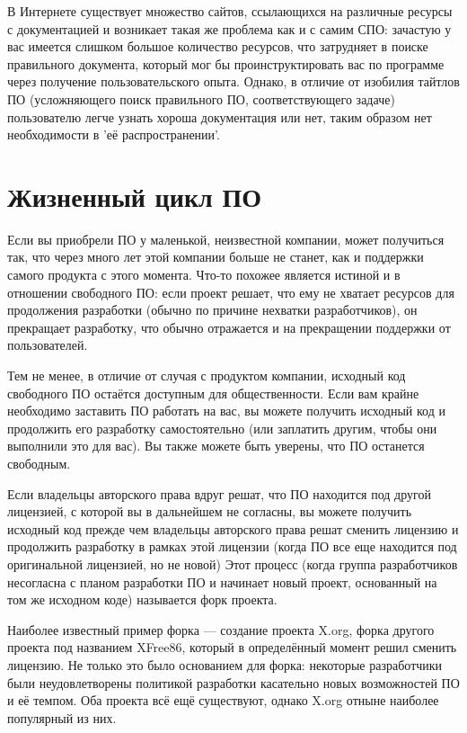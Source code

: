 \documentclass[12pt]{book}
\begin{document}
В Интернете существует множество сайтов, ссылающихся на различные ресурсы с документацией и возникает такая же проблема как и с самим СПО: зачастую у вас имеется слишком большое количество ресурсов, что затрудняет в поиске правильного документа, который мог бы проинструктировать вас по программе через получение пользовательского опыта. Однако, в отличие от изобилия тайтлов ПО (усложняющего поиск правильного ПО, соответствующего задаче) пользователю легче узнать хороша документация или нет, таким образом нет необходимости в 'её распространении'.

\section{Жизненный цикл ПО}

Если вы приобрели ПО у маленькой, неизвестной компании, может получиться так, что через много лет этой компании больше не станет, как и поддержки самого продукта с этого момента. Что-то похожее является истиной и в отношении   свободного ПО: если проект решает, что ему не хватает ресурсов для продолжения разработки (обычно по причине нехватки разработчиков), он прекращает разработку, что обычно отражается и на прекращении поддержки от пользователей.

Тем не менее, в отличие от случая с продуктом компании, исходный код свободного ПО остаётся доступным для общественности. Если вам крайне необходимо заставить ПО работать на вас, вы можете получить исходный код и продолжить его разработку самостоятельно (или заплатить другим, чтобы они выполнили это для вас). Вы также можете быть уверены, что ПО останется свободным. 

Если владельцы авторского права вдруг решат, что ПО находится под другой лицензией, с которой вы в дальнейшем не согласны, вы можете получить исходный код прежде чем владельцы авторского права решат сменить лицензию и продолжить разработку в рамках этой лицензии (когда ПО все еще находится под оригинальной лицензией, но не новой) Этот процесс (когда группа разработчиков несогласна с планом разработки ПО и начинает новый проект, основанный на том же исходном коде) называется форк проекта.

Наиболее известный пример форка — создание проекта X.org, форка другого проекта под названием XFree86, который в определённый момент решил сменить лицензию. Не только это было основанием для форка: некоторые разработчики были неудовлетворены политикой разработки касательно новых возможностей ПО и её темпом. Оба проекта всё ещё существуют, однако X.org отныне наиболее популярный из них.
\end{document}
